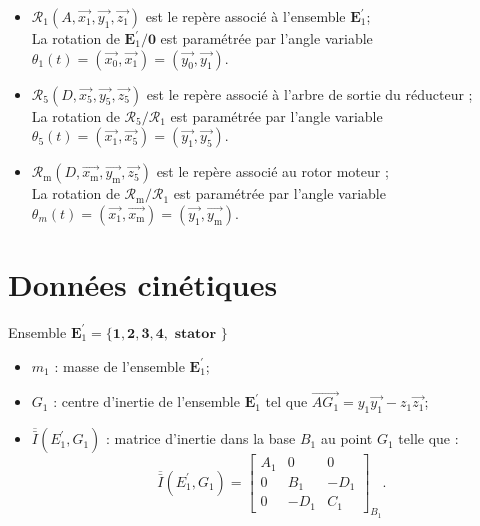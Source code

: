 \begin{itemize}
  \item[-] $\mathcal{R}_{1}\left(A, \overrightarrow{x_{1}}, \overrightarrow{y_{1}}, \overrightarrow{z_{1}}\right)$ est le repère associé à l'ensemble $\boldsymbol{E}_{1}^{\prime}$;\\
La rotation de $\boldsymbol{E}_{1}^{\prime} / \mathbf{0}$ est paramétrée par l'angle variable $\theta_{1}(t)=\left(\overrightarrow{x_{0}}, \overrightarrow{x_{1}}\right)=\left(\overrightarrow{y_{0}}, \overrightarrow{y_{1}}\right)$.
  \item[-] $\mathcal{R}_{5}\left(D, \overrightarrow{x_{5}}, \overrightarrow{y_{5}}, \overrightarrow{z_{5}}\right)$ est le repère associé à l'arbre de sortie du réducteur ;\\
La rotation de $\mathcal{R}_{5} / \mathcal{R}_{1}$ est paramétrée par l'angle variable $\theta_{5}(t)=\left(\overrightarrow{x_{1}}, \overrightarrow{x_{5}}\right)=\left(\overrightarrow{y_{1}}, \overrightarrow{y_{5}}\right)$.
  \item[-] $\mathcal{R}_{\mathrm{m}}\left(D, \overrightarrow{x_{\mathrm{m}}}, \overrightarrow{y_{\mathrm{m}}}, \overrightarrow{z_{5}}\right)$ est le repère associé au rotor moteur ;\\
La rotation de $\mathcal{R}_{\mathrm{m}} / \mathcal{R}_{1}$ est paramétrée par l'angle variable $\theta_{m}(t)=\left(\overrightarrow{x_{1}}, \overrightarrow{x_{\mathrm{m}}}\right)=\left(\overrightarrow{y_{1}}, \overrightarrow{y_{\mathrm{m}}}\right)$.
\end{itemize}

\section*{Données cinétiques}
Ensemble $\boldsymbol{E}_{1}^{\prime}=\{\mathbf{1 , 2 , 3 , 4 , \text { stator } \}}$

\begin{itemize}
  \item[-] $m_{1}$ : masse de l'ensemble $\boldsymbol{E}_{1}^{\prime}$;
  \item[-] $G_{1}$ : centre d'inertie de l'ensemble $\boldsymbol{E}_{1}^{\prime}$ tel que $\overrightarrow{A G_{1}}=y_{1} \overrightarrow{y_{1}}-z_{1} \overrightarrow{z_{1}}$;
  \item[-] $\overline{\bar{I}}\left(E_{1}^{\prime}, G_{1}\right)$ : matrice d'inertie dans la base $B_{1}$ au point $G_{1}$ telle que :
$$
\overline{\bar{I}}\left(E_{1}^{\prime}, G_{1}\right)=\left[\begin{array}{ccc}
A_{1} & 0 & 0 \\
0 & B_{1} & -D_{1} \\
0 & -D_{1} & C_{1}
\end{array}\right]_{B_{1}} .
$$
\end{itemize}

